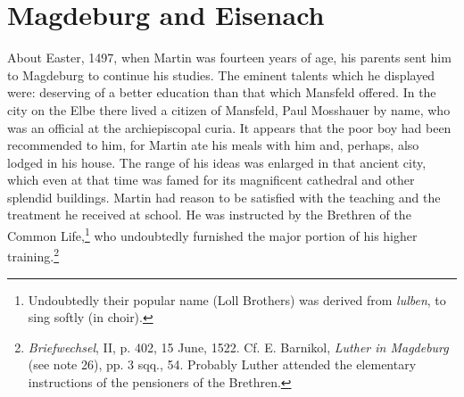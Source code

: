 \section{Magdeburg and Eisenach}

About Easter, 1497, when Martin was fourteen years of age, his
parents sent him to Magdeburg to continue his studies. The eminent
talents which he displayed were: deserving of a better education than
that which Mansfeld offered. In the city on the Elbe there lived a
citizen of Mansfeld, Paul Mosshauer by name, who was an official at the
archiepiscopal curia. It appears that the poor boy had been recommended to him, for Martin ate his meals with him and, perhaps,
also lodged in his house. The range of his ideas was enlarged in that
ancient city, which even at that time was famed for its magnificent
cathedral and other splendid buildings. Martin had reason to be satisfied with the teaching and the treatment he received at school. He
was instructed by the Brethren of the Common Life,\footnote{Undoubtedly their popular name (Loll Brothers) was derived from \textit{lulben}, to sing softly (in choir).}
who undoubtedly furnished the major portion of his higher training.\footnote{\textit{Briefwechsel}, II, p. 402, 15 June, 1522. Cf. E. Barnikol, \textit{Luther in Magdeburg} (see note 26),
pp. 3 sqq., 54. Probably Luther attended the elementary instructions of the pensioners
of the Brethren.
}


